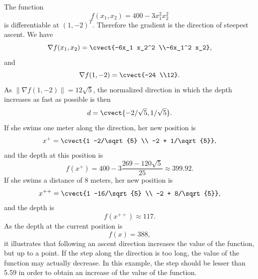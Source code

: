 
  The function
  \[
  f(x_1,x_2)=400-3x_1^2x_2^2
  \]is differentiable at
$(1,-2)^T$. Therefore the gradient is the direction of steepest
ascent. We have
\[
\nabla f(x_1,x_2)= \cvect{-6x_1 x_2^2 \\-6x_1^2 x_2},
\]
and
\[
\nabla f(1,-2)=\cvect{-24 \\12}.
\]
As $\|\nabla f(1,-2)\| = 12 \sqrt{5}$,
the normalized direction in which the depth increases as fast as
possible is then
\[
d = \cvect{-2/\sqrt{5},1/\sqrt{5}}.
\]
If she swims one meter along the direction, her new position is
\[
x^+ = \cvect{1 -2/\sqrt{5} \\ -2 + 1/\sqrt{5}},
\]
and the depth at this position is
\[
f(x^+) = 400 -3\frac{269-120\sqrt{5}}{25} \approx 399.92.
\]
If she swims a distance of 8 meters,
 her new position is
\[
x^{++} = \cvect{1 -16/\sqrt{5} \\ -2 + 8/\sqrt{5}},
\]
and the depth is
\[
f(x^{++}) \approx 117.
\]
As the depth at the current position is
\[
f(x) = 388,
\]
it illustrates that following an ascent direction increases the value
of the function, but up to a point. If the step along the direction is too
long, the value of the function may actually decrease. In this
example, the step should be lesser than 5.59 in order to obtain an
increase of the value of the function. 

